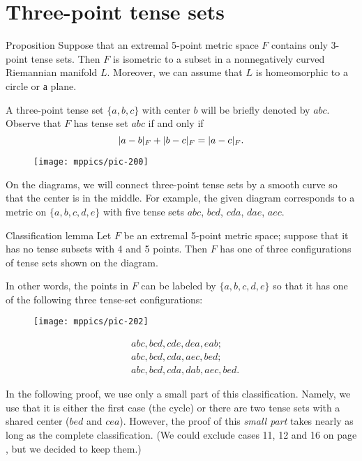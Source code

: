 \documentclass{article}
\begin{document}
\section{Three-point tense sets}\label{sec:3-tense}

\begin{thm}{Proposition}\label{prop:3-tense}
Suppose that an extremal 5-point metric space $F$ contains only 3-point tense sets.
Then $F$ is isometric to a subset in a nonnegatively curved Riemannian manifold $L$.
Moreover, we can assume that $L$ is homeomorphic to a circle or а plane.
\end{thm}

A three-point tense set $\{a,b,c\}$ with center $b$ will be briefly denoted by $abc$.
Observe that $F$ has tense set $abc$ if and only if 
\[|a-b|_F+|b-c|_F\z=|a-c|_F.\]

{

\begin{wrapfigure}{r}{20mm}
\vskip-6mm
\centering
\texttt{[image: mppics/pic-200]}
\end{wrapfigure}

On the diagrams, we will connect three-point tense sets by a smooth curve so that the center is in the middle.
For example, the given diagram corresponds to a metric on $\{a,b,c,d,e\}$ with five tense sets $abc$, $bcd$, $cda$, $dae$, $aec$.

}

\begin{thm}{Classification lemma}\label{lem:key}
Let $F$ be an extremal 5-point metric space; suppose that it has no tense subsets with 4 and 5 points.
Then $F$ has one of three configurations of tense sets shown on the diagram.

In other words, the points in $F$ can be labeled by $\{a,b,c,d,e\}$ so that it has
one of the following three tense-set configurations:

\begin{wrapfigure}{r}{50mm}
\vskip2mm
\centering
\texttt{[image: mppics/pic-202]}
\end{wrapfigure}
\vskip-6mm
\begin{align*}
&abc, bcd, cde, dea, eab;
\\
&abc, bcd, cda, aec, bed;
\\
&abc, bcd, cda, dab, aec, bed.
\end{align*}

\end{thm}

In the following proof, we use only a small part of this classification.
Namely, we use that it is either the first case (the cycle) or there are two tense sets with a shared center ($bed$ and $cea$).  
However, the proof of this \emph{small part} takes nearly as long as the complete classification.
(We could exclude cases 11, 12 and 16 on page \pageref{pic-210}, but we decided to keep them.) 
\end{document}
